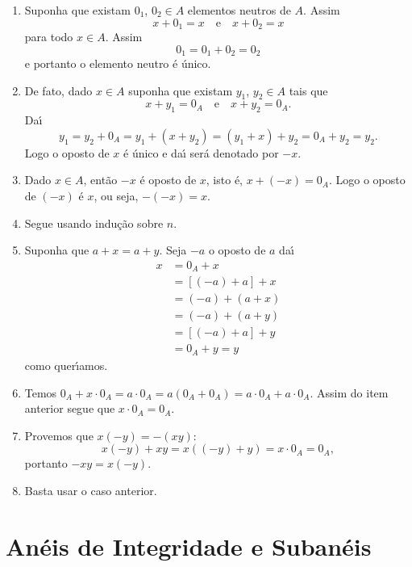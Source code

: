 \begin{prova}
	\begin{enumerate}[label={\roman*})]
		\item Suponha que existam $0_1$, $0_2\in A$ elementos neutros de $A$. Assim
		\[
			x + 0_1 = x \quad \mbox{e}\quad x + 0_2 = x	
		\]
		para todo $x \in A$. Assim
		\[
			0_1 = 0_1 + 0_2 = 0_2
		\]
		e portanto o elemento neutro \'e \'unico.

		\item De fato, dado $x \in A$ suponha que existam $y_1$, $y_2\in A$ tais que
		\[
			x + y_1 = 0_A \quad \mbox{e}\quad x + y_2 = 0_A.
		\]
		Da{\'\i}
		\[
			y_1 = y_2 + 0_A = y_1 + (x + y_2) = (y_1 + x) + y_2 = 0_A + y_2 =y_2.
		\]
		Logo o oposto de $x$ \'e \'unico  e da{\'\i} ser\'a denotado por $-x$.
		
		\item Dado $x \in A$, ent\~ao $-x$ {\'e} oposto de $x$, isto {\'e}, $x + (-x) = 0_A$. Logo o oposto de $(-x)$ {\'e} $x$, ou seja, $-(-x) = x$.

		\item Segue usando indu\c{c}\~ao sobre $n$.

		\item Suponha que $a + x = a + y$. Seja $-a$ o oposto de $a$ da{\'\i}
		\begin{align*}
			x &= 0_A + x \\ &= [(-a) + a] + x\\ &= (-a) + (a + x) \\ &= (-a) + (a + y) \\ &= [(-a) + a] + y \\ &= 0_A + y = y
		\end{align*}
		como quer{\'\i}amos.

		\item Temos $0_A + x\cdot 0_A = a\cdot 0_A = a(0_A + 0_A) = a\cdot 0_A + a\cdot 0_A$. Assim do item anterior segue que $x\cdot 0_A = 0_A$.

		\item Provemos que $x(-y) = -(xy)$:
		\[
			x(-y) + xy = x((-y) + y) = x\cdot 0_A = 0_A,
		\]
		portanto $-xy = x(-y)$.

		\item Basta usar o caso anterior.
	\end{enumerate}
\end{prova}

\section{Anéis de Integridade e Subanéis} %
\label{sec:aneis_de_integridade_e_subaneis}

